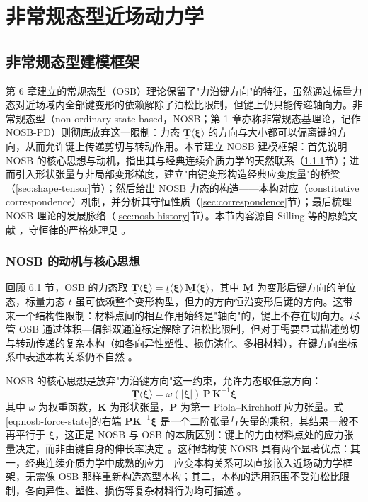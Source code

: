 \chapter{非常规态型近场动力学}

\section{非常规态型建模框架}\label{sec:nosb-framework}

第 6 章建立的常规态型（OSB）理论保留了"力沿键方向"的特征，虽然通过标量力态对近场域内全部键变形的依赖解除了泊松比限制，但键上仍只能传递轴向力。非常规态型（non-ordinary state-based，NOSB；第 1 章亦称非常规态基理论，记作 NOSB-PD）则彻底放弃这一限制：力态 $\underline{\mathbf{T}}\langle\boldsymbol{\xi}\rangle$ 的方向与大小都可以偏离键的方向，从而允许键上传递剪切与转动作用。本节建立 NOSB 建模框架：首先说明 NOSB 的核心思想与动机，指出其与经典连续介质力学的天然联系（\ref{sec:nosb-motivation}节）；进而引入形状张量与非局部变形梯度，建立"由键变形构造经典应变度量"的桥梁（\ref{sec:shape-tensor}节）；然后给出 NOSB 力态的构造——本构对应（constitutive correspondence）机制，并分析其守恒性质（\ref{sec:correspondence}节）；最后梳理 NOSB 理论的发展脉络（\ref{sec:nosb-history}节）。本节内容源自 Silling 等的原始文献 \cite{Silling2007}，守恒律的严格处理见 \cite{SillingLehoucq2010}。

\subsection{NOSB 的动机与核心思想}\label{sec:nosb-motivation}

回顾 6.1 节，OSB 的力态取 $\underline{\mathbf{T}}\langle\boldsymbol{\xi}\rangle=\underline{t}\langle\boldsymbol{\xi}\rangle\,\underline{\mathbf{M}}\langle\boldsymbol{\xi}\rangle$，其中 $\underline{\mathbf{M}}$ 为变形后键方向的单位态，标量力态 $\underline{t}$ 虽可依赖整个变形构型，但力的方向恒沿变形后键的方向。这带来一个结构性限制：材料点间的相互作用始终是"轴向"的，键上不存在切向力。尽管 OSB 通过体积—偏斜双通道标定解除了泊松比限制，但对于需要显式描述剪切与转动传递的复杂本构（如各向异性塑性、损伤演化、多相材料），在键方向坐标系中表述本构关系仍不自然 \cite{Silling2007}。

NOSB 的核心思想是放弃"力沿键方向"这一约束，允许力态取任意方向：
\begin{equation}
  \underline{\mathbf{T}}\langle\boldsymbol{\xi}\rangle=\omega(|\boldsymbol{\xi}|)\,\mathbf{P}\,\mathbf{K}^{-1}\boldsymbol{\xi}
  \label{eq:nosb-force-state}
\end{equation}
其中 $\omega$ 为权重函数，$\mathbf{K}$ 为形状张量，$\mathbf{P}$ 为第一 Piola–Kirchhoff 应力张量。式\eqref{eq:nosb-force-state}的右端 $\mathbf{P}\mathbf{K}^{-1}\boldsymbol{\xi}$ 是一个二阶张量与矢量的乘积，其结果一般不再平行于 $\boldsymbol{\xi}$，这正是 NOSB 与 OSB 的本质区别：键上的力由材料点处的应力张量决定，而非由键自身的伸长率决定 \cite{Silling2007,Warren2009}。这种结构使 NOSB 具有两个显著优点：其一，经典连续介质力学中成熟的应力—应变本构关系可以直接嵌入近场动力学框架，无需像 OSB 那样重新构造态型本构；其二，本构的适用范围不受泊松比限制，各向异性、塑性、损伤等复杂材料行为均可描述 \cite{Warren2009,Breitenfeld2014}。


